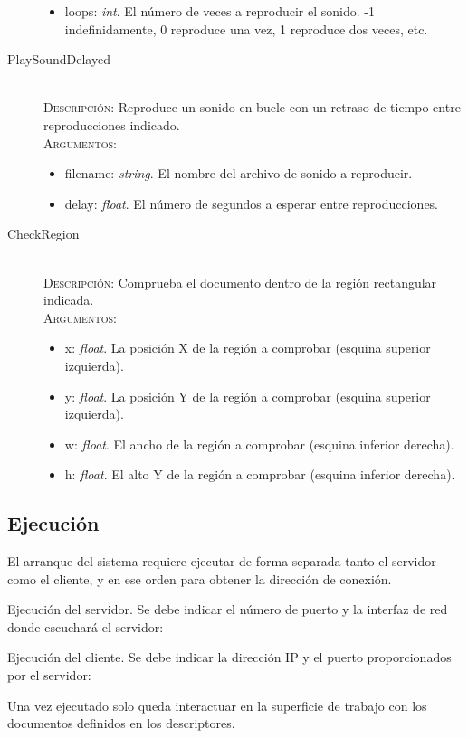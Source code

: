 \begin{description}
\begin{itemize}
  \item loops: \textit{int}. El número de veces a reproducir el sonido. -1 indefinidamente, 0
    reproduce una vez, 1 reproduce dos veces, etc.
  \end{itemize}
\item[PlaySoundDelayed] \hfill \\
  \textsc{Descripción:} Reproduce un sonido en bucle con un retraso de tiempo entre reproducciones indicado. \\
  \textsc{Argumentos:}
  \begin{itemize}
  \item filename: \textit{string}. El nombre del archivo de sonido a reproducir.
  \item delay: \textit{float}. El número de segundos a esperar entre reproducciones.
  \end{itemize}
\item[CheckRegion] \hfill \\
  \textsc{Descripción:} Comprueba el documento dentro de la región rectangular indicada. \\
  \textsc{Argumentos:}
  \begin{itemize}
  \item x: \textit{float}. La posición X de la región a comprobar (esquina superior izquierda).
  \item y: \textit{float}. La posición Y de la región a comprobar (esquina superior izquierda).
  \item w: \textit{float}. El ancho de la región a comprobar (esquina inferior derecha).
  \item h: \textit{float}. El alto Y de la región a comprobar (esquina inferior derecha).
  \end{itemize}
\end{description}

\subsection{Ejecución}

El arranque del sistema requiere ejecutar de forma separada tanto el servidor como el cliente, y en
ese orden para obtener la dirección de conexión.

Ejecución del servidor. Se debe indicar el número de puerto y la interfaz de red donde escuchará el
servidor:

\begin{listing}[%
  style=consola]
$ ./argos_server <port> <iface>}
\end{listing}

Ejecución del cliente. Se debe indicar la dirección IP y el puerto proporcionados por el
servidor:


Una vez ejecutado solo queda interactuar en la superficie de trabajo con los documentos definidos
en los descriptores.

